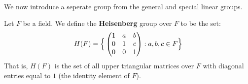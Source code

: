 We now introduce a seperate group from the general and special linear groups.

\begin{definition}
  Let $F$ be a field. We define the \textbf{Heisenberg} group over $F$ to be
  the set:
  \begin{equation}
    H(F)= \Big{\{}
      \begin{pmatrix}
        1   &   a   &   b   \\
        0   &   1   &   c   \\
        0   &   0   &   1   \\
      \end{pmatrix} :
      a,b,c \in F
    \Big{\}}
  \end{equation}
  That is, $H(F)$ is the set of all upper triangular matrices over $F$ with
  diagonal entries equal to $1$  (the identity element of $F$).
\end{definition}

